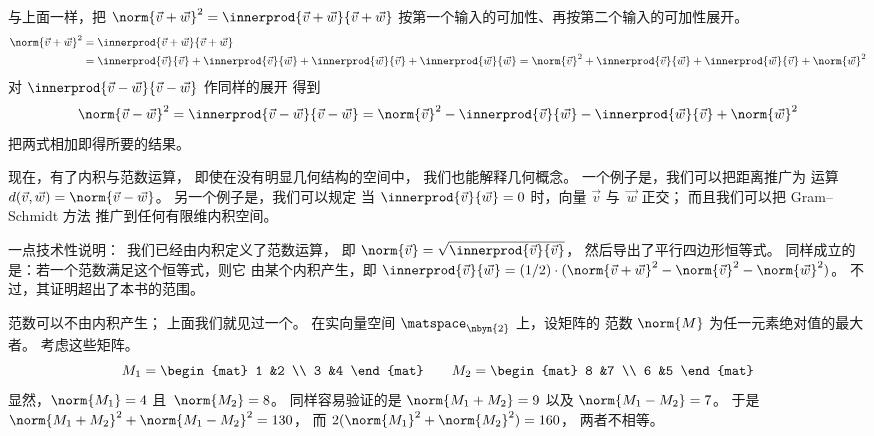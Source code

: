与上面一样，把
$
  \norm{\vec{v}+\vec{w}}^2=\innerprod{\vec{v}+\vec{w}}{\vec{v}+\vec{w}}
$
按第一个输入的可加性、再按第二个输入的可加性展开。
\begin{align*}
  \norm{\vec{v}+\vec{w}}^2
  &=\innerprod{\vec{v}+\vec{w}}{\vec{v}+\vec{w}}           \\
  &=\innerprod{\vec{v}}{\vec{v}}            
   +\innerprod{\vec{v}}{\vec{w}}
   +\innerprod{\vec{w}}{\vec{v}}
   +\innerprod{\vec{w}}{\vec{w}}
  =\norm{\vec{v}}^2            
   +\innerprod{\vec{v}}{\vec{w}}
   +\innerprod{\vec{w}}{\vec{v}}
   +\norm{\vec{w}}^2
\end{align*}
对 $\innerprod{\vec{v}-\vec{w}}{\vec{v}-\vec{w}}$ 作同样的展开
得到
\begin{equation*}
  \norm{\vec{v}-\vec{w}}^2
  =\innerprod{\vec{v}-\vec{w}}{\vec{v}-\vec{w}}
  =\norm{\vec{v}}^2
   -\innerprod{\vec{v}}{\vec{w}}
   -\innerprod{\vec{w}}{\vec{v}}
   +\norm{\vec{w}}^2
\end{equation*}
把两式相加即得所要的结果。

现在，有了内积与范数运算，
即使在没有明显几何结构的空间中，
我们也能解释几何概念。
一个例子是，我们可以把距离推广为
运算
$d(\vec{v},\vec{w})=\norm{\vec{v}-\vec{w}}$。
另一个例子是，我们可以规定
当 $\innerprod{\vec{v}}{\vec{w}}=0$
时，向量 $\vec{v}$ 与~$\vec{w}$ 正交；
而且我们可以把 Gram--Schmidt 方法
推广到任何有限维内积空间。

一点技术性说明：~我们已经由内积定义了范数运算，
即 $\norm{\vec{v}}=\sqrt{\smashdp{\innerprod{\vec{v}}{\vec{v}}}}$，
然后导出了平行四边形恒等式。
同样成立的是：若一个范数满足这个恒等式，则它
由某个内积产生，即
$\innerprod{\vec{v}}{\vec{w}}
  =(1/2)\cdot(\norm{\vec{v}+\vec{w}}^2-\norm{\vec{v}}^2-\norm{\vec{w}}^2)$。
不过，其证明超出了本书的范围。

范数可以不由内积产生；
上面我们就见过一个。
在实向量空间 $\matspace_{\nbyn{2}}$ 上，设矩阵的
范数 $\norm{M}$ 为任一元素绝对值的最大者。
考虑这些矩阵。
\begin{equation*}
  M_1=
  \begin{mat}
  1  &2 \\
  3  &4  
  \end{mat}
  \qquad
  M_2=
  \begin{mat}
  8  &7  \\
  6  &5
  \end{mat}
\end{equation*}
显然，$\norm{M_1}=4$ 且~$\norm{M_2}=8$。
同样容易验证的是 $\norm{M_1+M_2}=9$
以及 $\norm{M_1-M_2}=7$。
于是 $\norm{M_1+M_2}^2+\norm{M_1-M_2}^2=130$，
而 $2(\norm{M_1}^2+\norm{M_2}^2)=160$，
两者不相等。

